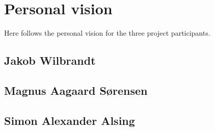 
\chapter{Personal vision}
Here follows the personal vision for the three project participants.

\section{Jakob Wilbrandt}

\section{Magnus Aagaard Sørensen}

\section{Simon Alexander Alsing}

